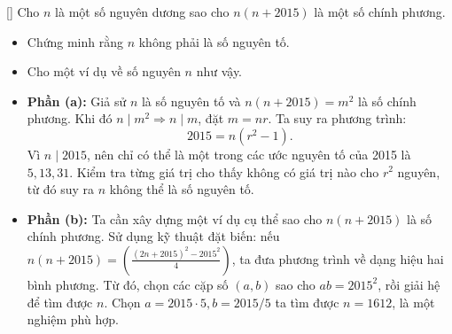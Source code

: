\documentclass[../04-diophantine-equations.tex]{subfiles}
\begin{document}
\begin{example*}\label{example:FRA-2015-TST1-P3}[\textbf{}]
	Cho \( n \) là một số nguyên dương sao cho \( n(n + 2015) \) là một số chính phương.
    \begin{itemize}[topsep=0pt, partopsep=0pt, itemsep=0pt]
        \item Chứng minh rằng \( n \) không phải là số nguyên tố.
        \item Cho một ví dụ về số nguyên \( n \) như vậy.
    \end{itemize}
\end{example*}

\begin{story*}
    \begin{itemize}[topsep=0pt, partopsep=0pt, itemsep=0pt]
        \item \textbf{Phần (a):} Giả sử \( n \) là số nguyên tố và \( n(n + 2015) = m^2 \) là số chính phương.  
        Khi đó \( n \mid m^2 \Rightarrow n \mid m \), đặt \( m = nr \). Ta suy ra phương trình:  
        \[
            2015 = n(r^2 - 1).
        \]
        Vì \( n \mid 2015 \), nên chỉ có thể là một trong các ước nguyên tố của 2015 là \( 5, 13, 31 \).  
        Kiểm tra từng giá trị cho thấy không có giá trị nào cho \( r^2 \) nguyên, từ đó suy ra \( n \) không thể là số nguyên tố.
        
        \item \textbf{Phần (b):} Ta cần xây dựng một ví dụ cụ thể sao cho \( n(n + 2015) \) là số chính phương.  
        Sử dụng kỹ thuật đặt biến: nếu \( n(n + 2015) = \left(\frac{(2n + 2015)^2 - 2015^2}{4} \right) \), ta đưa phương trình về dạng hiệu hai bình phương.  
        Từ đó, chọn các cặp số \( (a, b) \) sao cho \( ab = 2015^2 \), rồi giải hệ để tìm được \( n \).  
        Chọn \( a = 2015 \cdot 5, b = 2015/5 \) ta tìm được \( n = 1612 \), là một nghiệm phù hợp.
    \end{itemize}
\end{story*}
\end{document}
